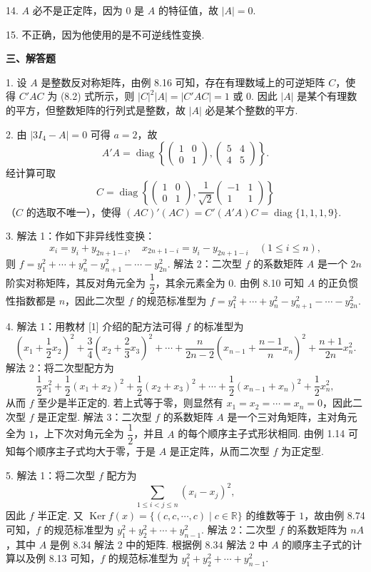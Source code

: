 \documentclass[UTF8, 12pt, fontset=fandol, oneside]{ctexart}
\begin{document}
14. $A$ 必不是正定阵，因为 $0$ 是 $A$ 的特征值，故 $|A|=0$.

15. 不正确，因为他使用的是不可逆线性变换.

\noindent\textbf{三、解答题}

1. 设 $A$ 是整数反对称矩阵，由例 8.16 可知，存在有理数域上的可逆矩阵 $C$，使得 $C'AC$ 为 (8.2) 式所示，则 $|C|^2|A|=|C'AC|=1$ 或 $0$. 因此 $|A|$ 是某个有理数的平方，但整数矩阵的行列式是整数，故 $|A|$ 必是某个整数的平方.

2. 由 $|3I_4-A|=0$ 可得 $a=2$，故
\[
A'A=\operatorname{diag}\left\{\left(\begin{array}{cc}1&0\\ 0&1\end{array}\right),
\left(\begin{array}{cc}5&4\\ 4&5\end{array}\right)\right\}.
\]
经计算可取
\[
C=\operatorname{diag}\left\{\left(\begin{array}{cc}1&0\\ 0&1\end{array}\right),
\frac1{\sqrt2}\left(\begin{array}{cc}-1&1\\ 1&1\end{array}\right)\right\}
\]
（$C$ 的选取不唯一），使得 $(AC)'(AC)=C'(A'A)C=\operatorname{diag}\{1,1,1,9\}$.

3. 解法 1：作如下非异线性变换：
\[
x_i=y_i+y_{2n+1-i},\quad x_{2n+1-i}=y_i-y_{2n+1-i}\quad (1\le i\le n),
\]
则 $f=y_1^2+\cdots+y_n^2-y_{n+1}^2-\cdots-y_{2n}^2$.
解法 2：二次型 $f$ 的系数矩阵 $A$ 是一个 $2n$ 阶实对称矩阵，其反对角元全为 $\dfrac12$，其余元素全为 $0$. 由例 8.10 可知 $A$ 的正负惯性指数都是 $n$，因此二次型 $f$ 的规范标准型为 $f=y_1^2+\cdots+y_n^2-y_{n+1}^2-\cdots-y_{2n}^2$.

4. 解法 1：用教材 [1] 介绍的配方法可得 $f$ 的标准型为
\[
\left(x_1+\frac12x_2\right)^2+\frac34\left(x_2+\frac23x_3\right)^2+\cdots+
\frac{n}{2n-2}\left(x_{n-1}+\frac{n-1}{n}x_n\right)^2+\frac{n+1}{2n}x_n^2.
\]
解法 2：将二次型配方为
\[
\frac12x_1^2+\frac12(x_1+x_2)^2+\frac12(x_2+x_3)^2+\cdots+\frac12(x_{n-1}+x_n)^2+\frac12x_n^2,
\]
从而 $f$ 至少是半正定的. 若上式等于零，则显然有 $x_1=x_2=\cdots=x_n=0$，因此二次型 $f$ 是正定型.
解法 3：二次型 $f$ 的系数矩阵 $A$ 是一个三对角矩阵，主对角元全为 $1$，上下次对角元全为 $\dfrac12$，并且 $A$ 的每个顺序主子式形状相同. 由例 1.14 可知每个顺序主子式均大于零，于是 $A$ 是正定阵，从而二次型 $f$ 为正定型.

5. 解法 1：将二次型 $f$ 配方为
\[
\sum_{1\le i<j\le n}(x_i-x_j)^2,
\]
因此 $f$ 半正定. 又 $\operatorname{Ker}f(x)=\{(c,c,\cdots,c)\mid c\in\mathbb{R}\}$ 的维数等于 $1$，故由例 8.74 可知，$f$ 的规范标准型为 $y_1^2+y_2^2+\cdots+y_{n-1}^2$.
解法 2：二次型 $f$ 的系数矩阵为 $nA$，其中 $A$ 是例 8.34 解法 2 中的矩阵. 根据例 8.34 解法 2 中 $A$ 的顺序主子式的计算以及例 8.13 可知，$f$ 的规范标准型为 $y_1^2+y_2^2+\cdots+y_{n-1}^2$.
\end{document}
